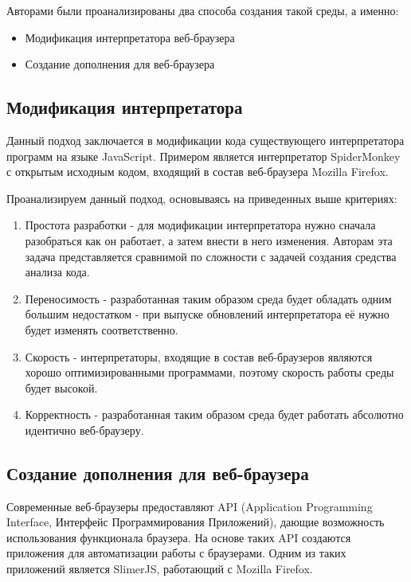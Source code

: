 	Авторами были проанализированы два способа создания такой среды, а именно:
	\begin{itemize}
		\item Модификация интерпретатора веб-браузера
		\item Создание дополнения для веб-браузера
	\end{itemize}

\subsection{Модификация интерпретатора}
	Данный подход заключается в модификации кода существующего интерпретатора программ на языке JavaScript. Примером является интерпретатор SpiderMonkey с открытым исходным кодом, входящий в состав веб-браузера Mozilla Firefox. 

	Проанализируем данный подход, основываясь на приведенных выше критериях:
	\begin{enumerate}
		\item Простота разработки - для модификации интерпретатора нужно сначала разобраться как он работает, а затем внести в него изменения. Авторам эта задача представляется сравнимой по сложности с задачей создания средства анализа кода.
		\item Переносимость - разработанная таким образом среда будет обладать одним большим недостатком - при выпуске обновлений интерпретатора её нужно будет изменять соответственно.
		\item Скорость - интерпретаторы, входящие в состав веб-браузеров являются хорошо оптимизированными программами, поэтому скорость работы среды будет высокой.
		\item Корректность - разработанная таким образом среда будет работать абсолютно идентично веб-браузеру.
	\end{enumerate}

\subsection{Создание дополнения для веб-браузера}
	Современные веб-браузеры предоставляют API (Application Programming Interface, Интерфейс Программирования Приложений), дающие возможность использования функционала браузера. На основе таких API создаются приложения для автоматизации работы с браузерами. Одним из таких приложений является SlimerJS, работающий с Mozilla Firefox. 


